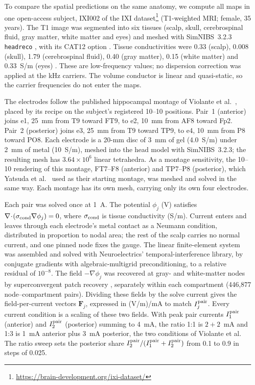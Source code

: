 \documentclass[11pt,a4paper]{article}
\begin{document}
\else
\label{supp:fem-protocol}
To compare the spatial predictions on the same anatomy, we compute all maps
in one open-access subject,
IXI002 of the IXI dataset\footnote{\url{https://brain-development.org/ixi-dataset/}}
(T1-weighted MRI; female, 35 years). The T1 image was segmented into six tissues
(scalp, skull, cerebrospinal fluid, gray matter, white matter and eyes) and meshed with
SimNIBS~3.2.3 \texttt{headreco} \cite{nielsen2018}, with its CAT12 option
\cite{gaser2024}. Tissue conductivities were 0.33 (scalp), 0.008 (skull), 1.79
(cerebrospinal fluid), 0.40 (gray matter), 0.15 (white matter) and 0.33~S/m (eyes)
\cite{salvador2025}. These are low-frequency values; no dispersion correction was
applied at the kHz carriers. The volume conductor is linear and quasi-static, so the
carrier frequencies do not enter the maps.

The electrodes follow the published hippocampal montage of Violante et al.\
\cite{violante2023}, placed by its recipe on the subject's registered 10--10
positions. Pair~1 (anterior) joins e1, 25~mm from T9 toward FT9, to e2, 10~mm from AF8
toward Fp2. Pair~2 (posterior) joins e3, 25~mm from T9 toward TP9, to e4, 10~mm from P8
toward PO8. Each electrode is a 20-mm disc of 3~mm of gel (4.0~S/m) under 2~mm of metal
(10~S/m), meshed into the head model with SimNIBS~3.2.3; the resulting mesh has
$3.64\times10^6$ linear tetrahedra. As a montage sensitivity, the 10--10 rendering of
this montage, FT7--F8 (anterior) and TP7--P8 (posterior), which Yatsuda et al.\
\cite{yatsuda2024} used as their starting montage, was meshed and solved in the same
way. Each montage has its own mesh, carrying only its own four electrodes.

Each pair was solved once at 1~A. The potential $\phi_j$ (V) satisfies
$\nabla\!\cdot\!(\sigma_{\rm cond}\nabla\phi_j)=0$, where
$\sigma_{\rm cond}$ is tissue conductivity (S/m). Current enters and leaves through each
electrode's metal contact as a Neumann condition, distributed in proportion to nodal
area; the rest of the scalp carries no normal current, and one pinned node fixes the
gauge. The linear finite-element system was assembled and solved with Neuroelectrics'
temporal-interference library, by conjugate gradients with algebraic-multigrid
preconditioning, to a relative residual of $10^{-8}$. The field
$-\nabla\phi_j$ was recovered at gray- and white-matter
nodes by superconvergent patch recovery \cite{zienkiewicz1992}, separately within each
compartment (446{,}877 node--compartment pairs). Dividing these fields by the solve
current gives the field-per-current vectors $\mathbf F_j$, expressed in
(V/m)/mA to match $I_j^{\rm pair}$. Every current condition is a scaling of these two fields.
With peak pair currents $I_1^{\rm pair}$ (anterior) and
$I_2^{\rm pair}$ (posterior) summing to 4~mA, the ratio 1:1 is $2+2$~mA and 1:3 is
1~mA anterior plus 3~mA posterior, the two conditions of Violante et al. The ratio sweep
sets the posterior share $I_2^{\rm pair}/(I_1^{\rm pair}+I_2^{\rm pair})$ from 0.1 to
0.9 in steps of 0.025.
\end{document}
